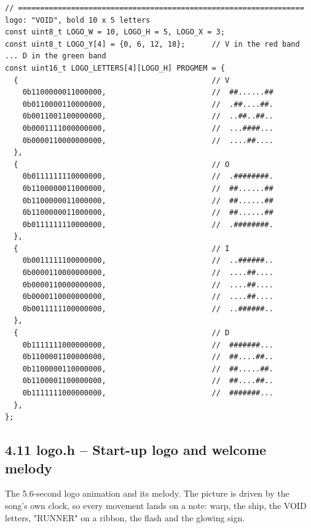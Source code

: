 \documentclass[11pt,a4paper]{article}
\begin{document}
\begin{lstlisting}[language=Arduino]
// ================================================================= logo: "VOID", bold 10 x 5 letters
const uint8_t LOGO_W = 10, LOGO_H = 5, LOGO_X = 3;
const uint8_t LOGO_Y[4] = {0, 6, 12, 18};      // V in the red band ... D in the green band
const uint16_t LOGO_LETTERS[4][LOGO_H] PROGMEM = {
  {                                            // V
    0b1100000011000000,                        //  ##......##
    0b0110000110000000,                        //  .##....##.
    0b0011001100000000,                        //  ..##..##..
    0b0001111000000000,                        //  ...####...
    0b0000110000000000,                        //  ....##....
  },
  {                                            // O
    0b0111111110000000,                        //  .########.
    0b1100000011000000,                        //  ##......##
    0b1100000011000000,                        //  ##......##
    0b1100000011000000,                        //  ##......##
    0b0111111110000000,                        //  .########.
  },
  {                                            // I
    0b0011111100000000,                        //  ..######..
    0b0000110000000000,                        //  ....##....
    0b0000110000000000,                        //  ....##....
    0b0000110000000000,                        //  ....##....
    0b0011111100000000,                        //  ..######..
  },
  {                                            // D
    0b1111111000000000,                        //  #######...
    0b1100001100000000,                        //  ##....##..
    0b1100000110000000,                        //  ##.....##.
    0b1100001100000000,                        //  ##....##..
    0b1111111000000000,                        //  #######...
  },
};
\end{lstlisting}

\clearpage
\subsection*{4.11 logo.h – Start-up logo and welcome melody}
The 5.6-second logo animation and its melody. The picture is driven by the song's own clock, so every movement lands on a note: warp, the ship, the VOID letters, "RUNNER" on a ribbon, the flash and the glowing sign.
\end{document}
